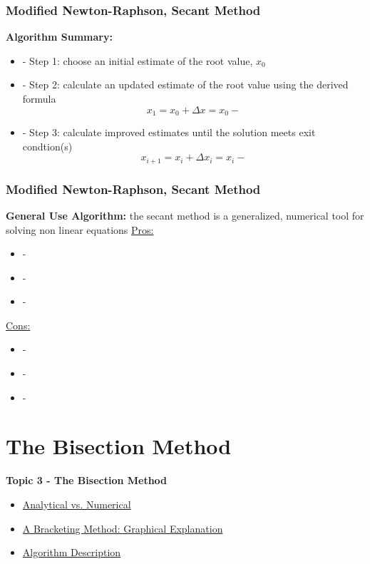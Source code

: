 \documentclass[fleqn]{ltx-talk} %
\newcommand{\sectionIIItitle}{The Bisection Method}
\newcommand{\sectionIIsubsectionVtitle}{Modified Newton-Raphson, Secant Method}
\newcommand{\sectionIIIsubsectionItitle}{Analytical vs. Numerical}
\newcommand{\sectionIIIsubsectionIItitle}{A Bracketing Method: Graphical Explanation}
\newcommand{\sectionIIIsubsectionIIItitle}{Algorithm Description}
\begin{document}
			\begin{frame}
				\frametitle{\sectionIIsubsectionVtitle}
				\bigskip

				\textbf{Algorithm Summary:}
				\begin{itemize}
						\item - Step 1: choose an initial estimate of the root value, $x_0$  
					\item - Step 2: calculate an updated estimate of the root value using the derived formula \vspace{2mm} \\
						\[ x_{1}=x_0 + \Delta x = x_0 -  \]
					\item - Step 3: calculate improved estimates until the solution meets exit condtion(s)
						\[ x_{i+1}=x_i + \Delta x_i = x_i -  \]
				\end{itemize}
				\btVFill 
			\end{frame}

			\begin{frame}
				\frametitle{\sectionIIsubsectionVtitle}\small
				\bigskip

				\textbf{General Use Algorithm:} the secant method is a generalized, numerical tool for solving non linear equations \vspcc
				\underline{Pros:}
				\begin{itemize}
			    	\item -
			    	\item -
			    	\item -
				\end{itemize} 

				\underline{Cons:}
				\begin{itemize}
					\item -
					\item -
					\item -
				\end{itemize}
				
				\btVFill 
			\end{frame}	
		
	\section{\sectionIIItitle}\label{sectionIII}

		\begin{frame}
			\large \textbf{Topic 3 - \sectionIIItitle} \vspace{3mm}\\

			\begin{itemize}
				\item \hyperref[sectionIIIsubsectionI]{\sectionIIIsubsectionItitle} \vspc %
				\item \hyperref[sectionIIIsubsectionII]{\sectionIIIsubsectionIItitle} \vspc %
				\item \hyperref[sectionIIIsubsectionIII]{\sectionIIIsubsectionIIItitle} \vspc %
			\end{itemize}

		\end{frame}
\end{document}
